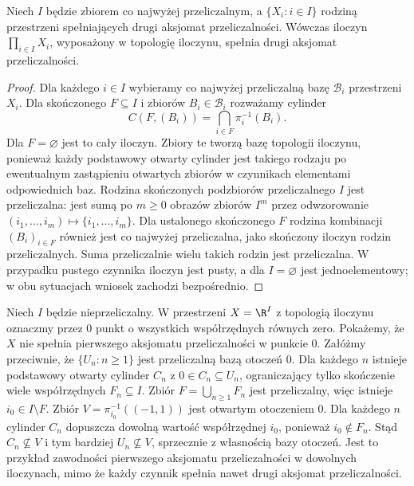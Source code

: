 \begin{twierdzenie}
\label{thm:topog-druga-iloczyn-przeliczalny}
Niech $I$ będzie zbiorem co najwyżej przeliczalnym,
a $\{X_i:i\in I\}$ rodziną przestrzeni spełniających
drugi aksjomat przeliczalności.
Wówczas iloczyn $\prod_{i\in I}X_i$, wyposażony w topologię
iloczynu, spełnia drugi aksjomat przeliczalności.
\end{twierdzenie}
\begin{proof}
Dla każdego $i\in I$ wybieramy co najwyżej przeliczalną bazę
$\mathcal B_i$ przestrzeni $X_i$. Dla skończonego $F\subseteq I$
i zbiorów $B_i\in\mathcal B_i$ rozważamy cylinder
\[
 C(F,(B_i))=\bigcap_{i\in F}\pi_i^{-1}(B_i).
\]
Dla $F=\varnothing$ jest to cały iloczyn. Zbiory te tworzą
bazę topologii iloczynu, ponieważ każdy podstawowy otwarty
cylinder jest takiego rodzaju po ewentualnym zastąpieniu
otwartych zbiorów w czynnikach elementami odpowiednich baz.
Rodzina skończonych podzbiorów przeliczalnego $I$ jest
przeliczalna: jest sumą po $m\geq0$ obrazów zbiorów
$I^m$ przez odwzorowanie $(i_1,\ldots,i_m)\mapsto
\{i_1,\ldots,i_m\}$. Dla ustalonego skończonego $F$
rodzina kombinacji $(B_i)_{i\in F}$ również jest
co najwyżej przeliczalna, jako skończony iloczyn rodzin
przeliczalnych. Suma przeliczalnie wielu takich rodzin jest przeliczalna.
W przypadku pustego czynnika iloczyn jest pusty,
a dla $I=\varnothing$ jest jednoelementowy; w obu sytuacjach
wniosek zachodzi bezpośrednio.
\end{proof}

\begin{przyklad}
\label{ex:topog-iloczyn-nieprzeliczalny}
Niech $I$ będzie nieprzeliczalny. W przestrzeni
$X=\R^I$ z topologią iloczynu oznaczmy przez $0$
punkt o wszystkich współrzędnych równych zero.
Pokażemy, że $X$ nie spełnia pierwszego aksjomatu
przeliczalności w punkcie $0$.
Załóżmy przeciwnie, że $\{U_n:n\geq1\}$ jest przeliczalną
bazą otoczeń $0$. Dla każdego $n$ istnieje podstawowy
otwarty cylinder $C_n$ z
$0\in C_n\subseteq U_n$, ograniczający tylko skończenie
wiele współrzędnych $F_n\subseteq I$. Zbiór
$F=\bigcup_{n\geq1}F_n$ jest przeliczalny, więc istnieje
$i_0\in I\setminus F$. Zbiór
$V=\pi_{i_0}^{-1}((-1,1))$ jest otwartym otoczeniem $0$.
Dla każdego $n$ cylinder $C_n$ dopuszcza dowolną wartość
współrzędnej $i_0$, ponieważ $i_0\notin F_n$.
Stąd $C_n\not\subseteq V$ i tym bardziej
$U_n\not\subseteq V$, sprzecznie z własnością bazy
otoczeń. Jest to przykład zawodności pierwszego aksjomatu
przeliczalności w dowolnych iloczynach, mimo że każdy
czynnik spełnia nawet drugi aksjomat przeliczalności.
\end{przyklad}

